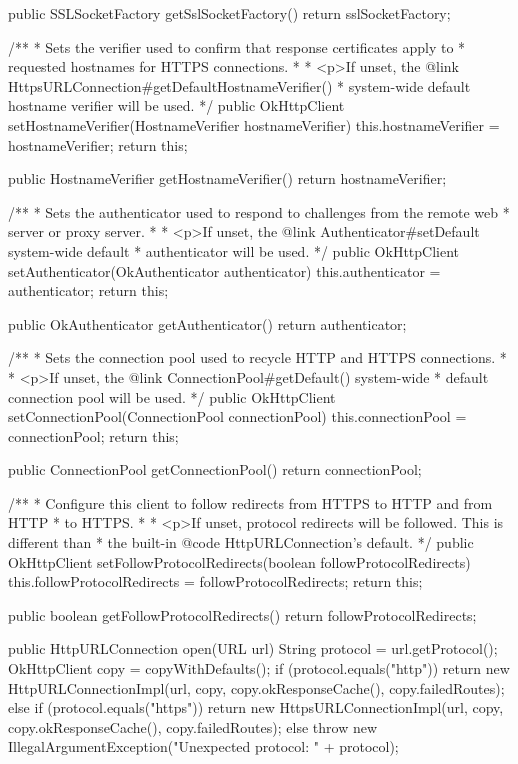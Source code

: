 \begin{prompt}
{  public SSLSocketFactory getSslSocketFactory() {
    return sslSocketFactory;
  }

  /**
   * Sets the verifier used to confirm that response certificates apply to
   * requested hostnames for HTTPS connections.
   *
   * <p>If unset, the {@link HttpsURLConnection#getDefaultHostnameVerifier()
   * system-wide default} hostname verifier will be used.
   */
  public OkHttpClient setHostnameVerifier(HostnameVerifier hostnameVerifier) {
    this.hostnameVerifier = hostnameVerifier;
    return this;
  }

  public HostnameVerifier getHostnameVerifier() {
    return hostnameVerifier;
  }

  /**
   * Sets the authenticator used to respond to challenges from the remote web
   * server or proxy server.
   *
   * <p>If unset, the {@link Authenticator#setDefault system-wide default}
   * authenticator will be used.
   */
  public OkHttpClient setAuthenticator(OkAuthenticator authenticator) {
    this.authenticator = authenticator;
    return this;
  }

  public OkAuthenticator getAuthenticator() {
    return authenticator;
  }

  /**
   * Sets the connection pool used to recycle HTTP and HTTPS connections.
   *
   * <p>If unset, the {@link ConnectionPool#getDefault() system-wide
   * default} connection pool will be used.
   */
  public OkHttpClient setConnectionPool(ConnectionPool connectionPool) {
    this.connectionPool = connectionPool;
    return this;
  }

  public ConnectionPool getConnectionPool() {
    return connectionPool;
  }

  /**
   * Configure this client to follow redirects from HTTPS to HTTP and from HTTP
   * to HTTPS.
   *
   * <p>If unset, protocol redirects will be followed. This is different than
   * the built-in {@code HttpURLConnection}'s default.
   */
  public OkHttpClient setFollowProtocolRedirects(boolean followProtocolRedirects) {
    this.followProtocolRedirects = followProtocolRedirects;
    return this;
  }

  public boolean getFollowProtocolRedirects() {
    return followProtocolRedirects;
  }

  public HttpURLConnection open(URL url) {
    String protocol = url.getProtocol();
    OkHttpClient copy = copyWithDefaults();
    if (protocol.equals("http")) {
      return new HttpURLConnectionImpl(url, copy, copy.okResponseCache(), copy.failedRoutes);
    } else if (protocol.equals("https")) {
      return new HttpsURLConnectionImpl(url, copy, copy.okResponseCache(), copy.failedRoutes);
    } else {
      throw new IllegalArgumentException("Unexpected protocol: " + protocol);
    }
  }

}
\end{prompt}
